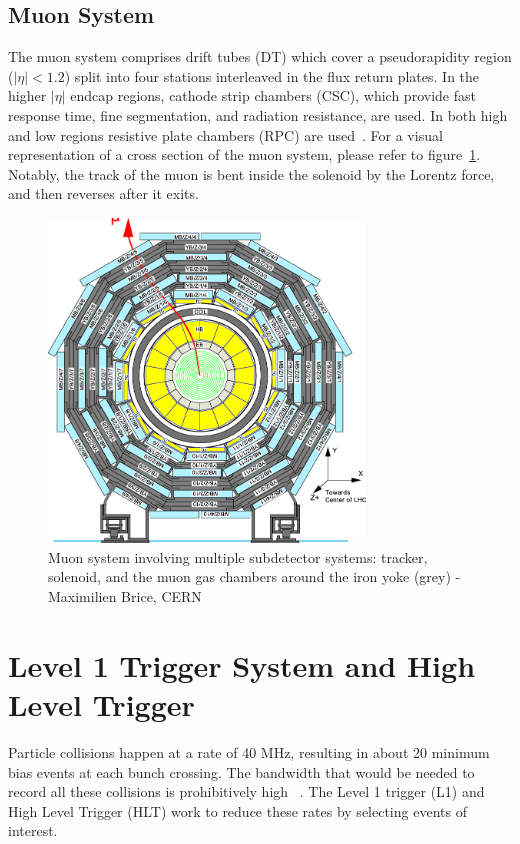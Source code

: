 \subsection{Muon System} 
The muon system comprises drift tubes (DT) which cover a pseudorapidity region ($|\eta|<1.2$) split into four stations interleaved in the flux return plates.
In the higher $|\eta|$ endcap regions, cathode strip chambers (CSC), which provide fast response time, fine segmentation, and radiation resistance, are used. In both high and low regions resistive plate chambers (RPC) are used~\cite{Chatrchyan:1129810}. For a visual representation of a cross section of the muon system, please refer to figure~\ref{fig:muonsystem}. 
Notably, the track of the muon is bent inside the solenoid by the Lorentz force, and then reverses after it exits. 

\begin{figure}[ht!b]
\label{fig:muonsystem} 
  \centering
\includegraphics[width=0.75\textwidth]{figures/Layout-of-the-CMS-barrel-muon-DT-chambers-in-one-of-the-5-wheels-59.png}    
    \caption{Muon system involving multiple subdetector systems: tracker, solenoid, and the muon gas chambers around the iron yoke (grey) - Maximilien Brice, CERN }
\end{figure}


\section{Level 1 Trigger System and High Level Trigger}
\label{sec:l1hlt}
Particle collisions happen at a rate of 40 MHz, resulting in about 20 minimum bias events at each bunch crossing. The bandwidth that would be needed to record all these collisions is prohibitively high ~\cite{Bruning:782076,Foudas:2232067}. The Level 1 trigger (L1) and High Level Trigger (HLT) work to reduce these rates by selecting events of interest. 

